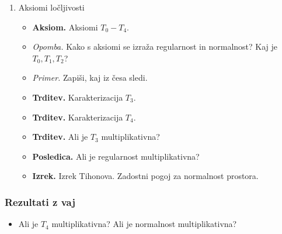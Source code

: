 \begin{enumerate}
    \item Aksiomi ločljivosti
    \begin{itemize}
        \item \colorbox{blue!30}{\textbf{Aksiom.}} Aksiomi $T_0 - T_4$.
        \item \colorbox{yellow!30}{\emph{Opomba.}} Kako s aksiomi se izraža regularnost in normalnost? Kaj je $T_0, T_1, T_2$? 
        \item \colorbox{yellow!30}{\emph{Primer.}} Zapiši, kaj iz česa sledi.
        \item \colorbox{blue!30}{\textbf{Trditev.}} Karakterizacija $T_3$.
        \item \colorbox{blue!30}{\textbf{Trditev.}} Karakterizacija $T_4$.
        \item \colorbox{blue!30}{\textbf{Trditev.}} Ali je $T_3$ multiplikativna?
        \item \colorbox{orange!30}{\textbf{Posledica.}} Ali je regularnost multiplikativna?
        \item \colorbox{blue!30}{\textbf{Izrek.}} Izrek Tihonova. Zadostni pogoj za normalnost prostora.
    \end{itemize}
\end{enumerate}

\subsubsection*{Rezultati z vaj}
\begin{itemize}
    \item Ali je $T_4$ multiplikativna? Ali je normalnost multiplikativna?
\end{itemize}

\newpage
